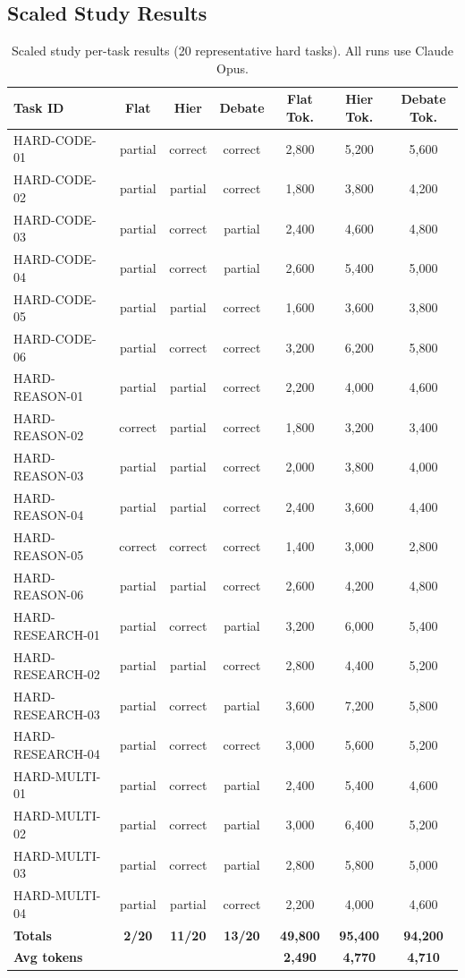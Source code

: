 \subsection{Scaled Study Results}

\begin{table}[h]
\centering
\caption{Scaled study per-task results (20 representative hard tasks). All runs use Claude Opus.}
\label{tab:scaled_results}
\scriptsize
\begin{tabular}{lcccccc}
\toprule
\textbf{Task ID} & \textbf{Flat} & \textbf{Hier} & \textbf{Debate} & \textbf{Flat Tok.} & \textbf{Hier Tok.} & \textbf{Debate Tok.} \\
\midrule
HARD-CODE-01 & partial & correct & correct & 2,800 & 5,200 & 5,600 \\
HARD-CODE-02 & partial & partial & correct & 1,800 & 3,800 & 4,200 \\
HARD-CODE-03 & partial & correct & partial & 2,400 & 4,600 & 4,800 \\
HARD-CODE-04 & partial & correct & partial & 2,600 & 5,400 & 5,000 \\
HARD-CODE-05 & partial & partial & correct & 1,600 & 3,600 & 3,800 \\
HARD-CODE-06 & partial & correct & correct & 3,200 & 6,200 & 5,800 \\
HARD-REASON-01 & partial & partial & correct & 2,200 & 4,000 & 4,600 \\
HARD-REASON-02 & correct & partial & correct & 1,800 & 3,200 & 3,400 \\
HARD-REASON-03 & partial & partial & correct & 2,000 & 3,800 & 4,000 \\
HARD-REASON-04 & partial & partial & correct & 2,400 & 3,600 & 4,400 \\
HARD-REASON-05 & correct & correct & correct & 1,400 & 3,000 & 2,800 \\
HARD-REASON-06 & partial & partial & correct & 2,600 & 4,200 & 4,800 \\
HARD-RESEARCH-01 & partial & correct & partial & 3,200 & 6,000 & 5,400 \\
HARD-RESEARCH-02 & partial & partial & correct & 2,800 & 4,400 & 5,200 \\
HARD-RESEARCH-03 & partial & correct & partial & 3,600 & 7,200 & 5,800 \\
HARD-RESEARCH-04 & partial & correct & correct & 3,000 & 5,600 & 5,200 \\
HARD-MULTI-01 & partial & correct & partial & 2,400 & 5,400 & 4,600 \\
HARD-MULTI-02 & partial & correct & partial & 3,000 & 6,400 & 5,200 \\
HARD-MULTI-03 & partial & correct & partial & 2,800 & 5,800 & 5,000 \\
HARD-MULTI-04 & partial & partial & correct & 2,200 & 4,000 & 4,600 \\
\midrule
\textbf{Totals} & \textbf{2/20} & \textbf{11/20} & \textbf{13/20} & \textbf{49,800} & \textbf{95,400} & \textbf{94,200} \\
\textbf{Avg tokens} & & & & \textbf{2,490} & \textbf{4,770} & \textbf{4,710} \\
\bottomrule
\end{tabular}
\end{table}

